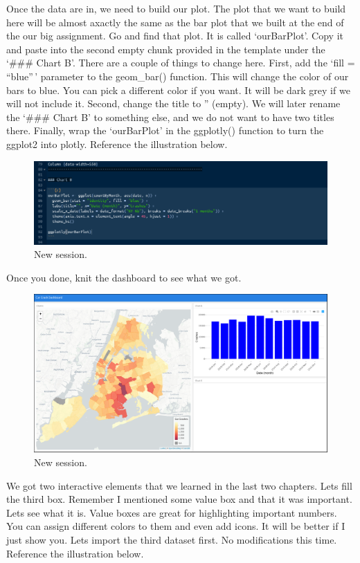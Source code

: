 \documentclass[]{book}
\begin{document}
Once the data are in, we need to build our plot. The plot that we want to build here will be almost axactly the same as the bar plot that we built at the end of the our big assignment. Go and find that plot. It is called `ourBarPlot'. Copy it and paste into the second empty chunk provided in the template under the `\#\#\# Chart B'. There are a couple of things to change here. First, add the `fill = ``blue''\,' parameter to the geom\_bar() function. This will change the color of our bars to blue. You can pick a different color if you want. It will be dark grey if we will not include it. Second, change the title to '' (empty). We will later rename the `\#\#\# Chart B' to something else, and we do not want to have two titles there. Finally, wrap the `ourBarPlot' in the ggplotly() function to turn the ggplot2 into plotly. Reference the illustration below.

\begin{figure}
\centering
\includegraphics{flex9.png}
\caption{New session.}
\end{figure}

Once you done, knit the dashboard to see what we got.

\begin{figure}
\centering
\includegraphics{flex10.png}
\caption{New session.}
\end{figure}

We got two interactive elements that we learned in the last two chapters. Lets fill the third box. Remember I mentioned some value box and that it was important. Lets see what it is. Value boxes are great for highlighting important numbers. You can assign different colors to them and even add icons. It will be better if I just show you. Lets import the third dataset first. No modifications this time. Reference the illustration below.
\end{document}

